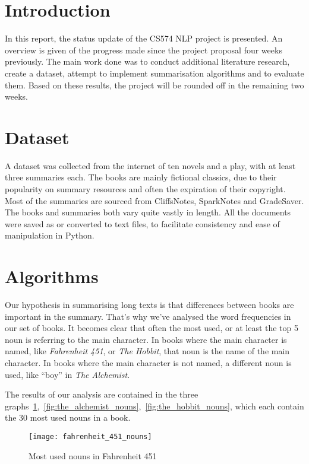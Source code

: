 \section{Introduction}
In this report, the status update of the CS574 NLP project is presented. An
overview is given of the progress made since the project proposal four weeks
previously. The main work done was to conduct additional literature research,
create a dataset, attempt to implement summarisation algorithms and to evaluate
them. Based on these results, the project will be rounded off in the remaining
two weeks.

\section{Dataset}
A dataset was collected from the internet of ten novels and a play, with at least three summaries each. The books are mainly fictional classics, due to their popularity on summary resources and often the expiration of their copyright. Most of the summaries are sourced from CliffsNotes, SparkNotes and GradeSaver. The books and summaries both vary quite vastly in length. All the documents were saved as or converted to text files, to facilitate consistency and ease of manipulation in Python.

\section{Algorithms}

Our hypothesis in summarising long texts is that differences between books are
important in the summary. That's why we've analysed the word frequencies in our
set of books. It becomes clear that often the most used, or at least the top 5
noun is referring to the main character. In books where the main character is
named, like \textit{Fahrenheit 451}, or \textit{The Hobbit}, that noun is the
name of the main character. In books where the main character is not named, a
different noun is used, like ``boy'' in \textit{The Alchemist}.

The results of our analysis are contained in the three
graphs~\ref{fig:fahrenheit_451_nouns},~\ref{fig:the_alchemist_nouns},~\ref{fig:the_hobbit_nouns},
which each contain the 30 most used nouns in a book.

\begin{figure}[h]
	\centering
	\texttt{[image: fahrenheit\_451\_nouns]}
	\caption{Most used nouns in Fahrenheit 451}\label{fig:fahrenheit_451_nouns}
\end{figure}

